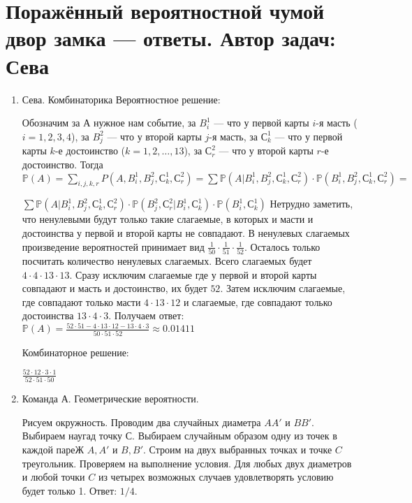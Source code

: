 \documentclass[a4paper,12pt]{article}
\def \P{\mathbb{P}}
\begin{document}
\newpage

\section{Поражённый вероятностной чумой двор замка — ответы. Автор задач: Сева}

\begin{enumerate}
\item Сева. Комбинаторика
Вероятностное решение:

Обозначим за $А$ нужное нам событие, за $B_i^1$ — что у первой карты $i$-я масть ($i = 1,2,3,4$), за $B_j^2$ — что у второй карты $j$-я масть, за $С_k^1$ — что у первой карты $k$-е достоинство ($k = 1,2,\dots,13$), 
за $С_r^2$ — что у второй карты $r$-е достоинство. 
Тогда $\P(A)=\sum_{i,j,k,r}P(A,B_i^1,B_j^2,С_k^1,С_r^2)=\sum \P(A|B_i^1,B_j^2,С_k^1,С_r^2)\cdot \P(B_i^1,B_j^2,С_k^1,С_r^2)=$

$\sum \P(A|B_i^1,B_j^2,С_k^1,С_r^2)\cdot \P(B_j^2,С_r^2|B_i^1,С_k^1)\cdot \P(B_i^1,С_k^1)$ 
Нетрудно заметить, что ненулевыми будут только такие слагаемые, в которых и масти и достоинства у первой и второй карты не совпадают. 
В ненулевых слагаемых произведение вероятностей принимает вид $\frac{1}{50}\cdot\frac{1}{51}\cdot\frac{1}{52}$. Осталось только посчитать количество ненулевых слагаемых. Всего слагаемых будет $4\cdot4\cdot13\cdot13$. Сразу исключим слагаемые где у первой и второй карты совпадают и масть и достоинство, их будет $52$. Затем исключим слагаемые, где совпадают только масти $4\cdot13\cdot12$ и слагаемые, где совпадают только достоинства $13\cdot4\cdot3$. Получаем ответ: $\P(A)=\frac{52\cdot51 - 4\cdot13\cdot12 - 13\cdot4\cdot3}{50\cdot51\cdot52}\approx0.01411$

Комбинаторное решение:

$\frac{52\cdot12\cdot3\cdot1}{52\cdot51\cdot50}$

\item Команда А. Геометрические вероятности.

Рисуем окружность. Проводим два случайных диаметра $AA'$ и $BB'$. Выбираем наугад точку $С$. Выбираем случайным образом одну из точек в каждой пареЖ $A,A'$ и $B,B'$. Строим на двух выбранных точках и точке $C$ треугольник. Проверяем на выполнение условия. Для любых двух диаметров и любой точки $C$ из четырех возможных случаев удовлетворять условию будет только 1. Ответ: $1/4$.


\end{enumerate}
\end{document}
